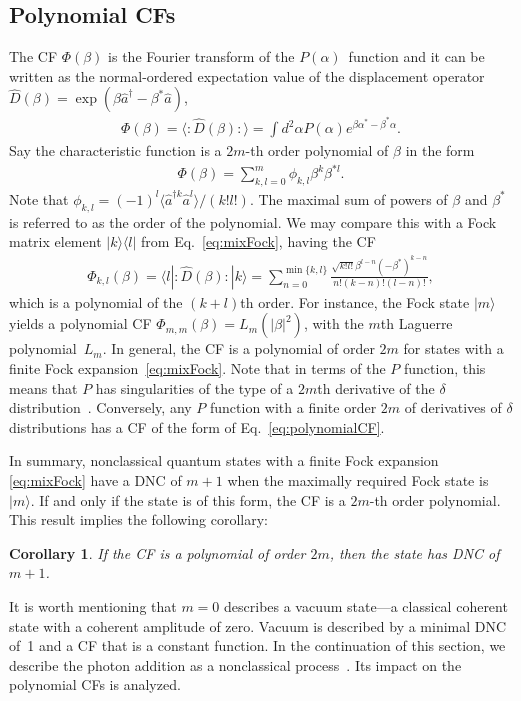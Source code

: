 \documentclass[aps,pra,twocolumn,showpacs,superscriptaddress,10pt]{revtex4-1}
\newtheorem{corollary}{Corollary}
\begin{document}
\subsection{Polynomial CFs}\label{subsec:PolyCF}
	The CF $\Phi(\beta)$ is the Fourier transform of the $P(\alpha)$~function and it can be written as the normal-ordered expectation value of the displacement operator $\hat D(\beta)=\exp(\beta\hat a^\dag-\beta^\ast\hat a)$,
	\begin{align}
		\Phi(\beta)=\langle{:}\hat D(\beta){:}\rangle=\int d^2\alpha P(\alpha)e^{\beta\alpha^\ast-\beta^\ast\alpha}.
	\end{align}
	Say the characteristic function is a $2m$-th order polynomial of $\beta$ in the form
	\begin{align}\label{eq:polynomialCF}
		\Phi(\beta)=\sum_{k,l=0}^m \phi_{k,l} \beta^{k}\beta^{\ast l}.
	\end{align}
	Note that $\phi_{k,l}=(-1)^l\langle\hat{a}^{\dag k}\hat{a}^{l}\rangle/(k!l!)$.
	The maximal sum of powers of $\beta$ and $\beta^\ast$ is referred to as the order of the polynomial.
	We may compare this with a Fock matrix element $|k\rangle\langle l|$ from Eq.~\eqref{eq:mixFock}, having the CF~\cite{Sperling2016}
	\begin{align}
		\Phi_{k,l}(\beta)=\langle l|{:}\hat D(\beta){:}|k\rangle
		=\sum_{n=0}^{\min\{k,l\}}\frac{\sqrt{k!l!}\beta^{l-n}(-\beta^\ast)^{k-n}}{n!(k-n)!(l-n)!},
	\end{align}
	which is a polynomial of the $(k+l)$th order.
	For instance, the Fock state $|m\rangle$ yields a polynomial CF $\Phi_{m,m}(\beta)=L_m(|\beta|^2)$, with the $m$th Laguerre polynomial~$L_m$.
	In general, the CF is a polynomial of order $2m$ for states with a finite Fock expansion~\eqref{eq:mixFock}.
	Note that in terms of the $P$ function, this means that $P$ has singularities of the type of a $2m$th derivative of the $\delta$ distribution~\cite{Cahill1969}.
	Conversely, any $P$ function with a finite order $2m$ of derivatives of $\delta$ distributions has a CF of the form of Eq.~\eqref{eq:polynomialCF}.

	In summary, nonclassical quantum states with a finite Fock expansion \eqref{eq:mixFock} have a DNC of $m+1$ when the maximally required Fock state is $|m\rangle$.
	If and only if the state is of this form, the CF is a $2m$-th order polynomial.
	This result implies the following corollary:
	\begin{corollary}
		If the CF is a polynomial of order $2m$, then the state has DNC of $m+1$.
	\end{corollary}
	It is worth mentioning that $m=0$ describes a vacuum state---a classical coherent state with a coherent amplitude of zero.
	Vacuum is described by a minimal DNC of~1 and a CF that is a constant function.
	In the continuation of this section, we describe the photon addition as a nonclassical process~\cite{Rahimi2013}.
	Its impact on the polynomial CFs is analyzed.
\end{document}
